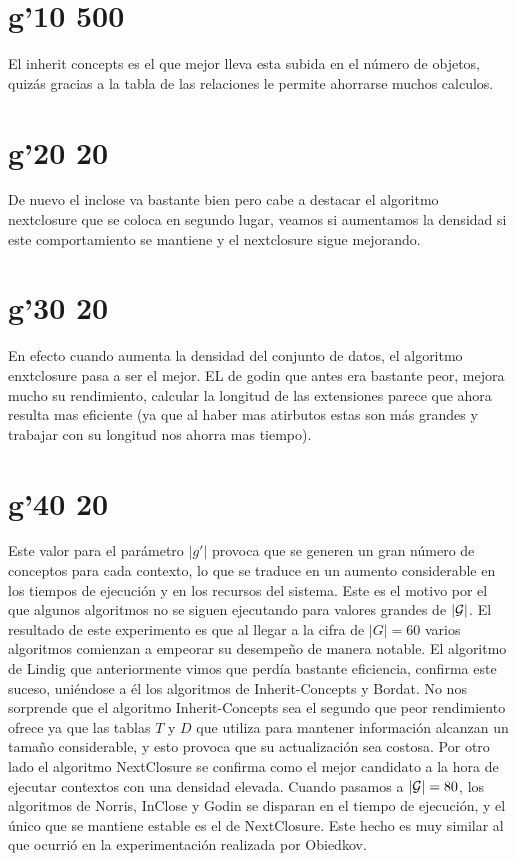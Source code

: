 \documentclass{article}
\begin{document}
\section{g'10 500}
El inherit concepts es el que mejor lleva esta subida en el número de objetos, quizás gracias a la tabla de las relaciones le permite ahorrarse muchos calculos.

\section{g'20 20}
De nuevo el inclose va bastante bien pero cabe a destacar el algoritmo nextclosure que se coloca en segundo lugar, veamos si aumentamos la densidad si este comportamiento se mantiene y el nextclosure sigue mejorando.

\section{g'30 20}
En efecto cuando aumenta la densidad del conjunto de datos, el algoritmo enxtclosure pasa a ser el mejor. EL de godin que antes era bastante peor, mejora mucho su rendimiento, calcular la longitud de las extensiones parece que ahora resulta mas eficiente (ya que al haber mas atirbutos estas son más grandes y trabajar con su longitud nos ahorra mas tiempo).

\section{g'40 20}

Este valor para el parámetro $|g'|$ provoca que se generen un gran número de conceptos para cada contexto, lo que se traduce en un aumento considerable en los tiempos de ejecución y en los recursos del sistema. Este es el motivo por el que algunos algoritmos no se siguen ejecutando para valores grandes de $|\mathcal{G}|$.  El resultado de este experimento es que al llegar a la cifra de $|G|=60$ varios algoritmos comienzan a empeorar su desempeño de manera notable. El algoritmo de Lindig que anteriormente vimos que perdía bastante eficiencia, confirma este suceso, uniéndose a él los algoritmos de Inherit-Concepts y Bordat. No nos sorprende que el algoritmo Inherit-Concepts sea el segundo que peor rendimiento ofrece ya que las tablas $T$ y $D$ que utiliza para mantener información alcanzan un tamaño considerable, y esto provoca que su actualización sea costosa. Por otro lado el algoritmo NextClosure se confirma como el mejor candidato a la hora de ejecutar contextos con una densidad elevada. Cuando pasamos a $|\mathcal{G}|=80$, los algoritmos de Norris, InClose y Godin se disparan en el tiempo de ejecución, y el único que se mantiene estable es el de NextClosure. Este hecho es muy similar al que ocurrió en la experimentación realizada por Obiedkov.
\end{document}
